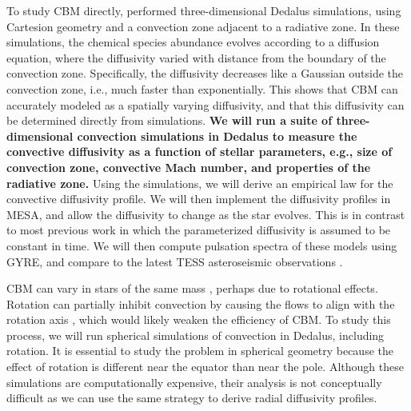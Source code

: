 To study CBM directly, \citet{Lecoanet_2016a} performed three-dimensional Dedalus simulations, using Cartesion geometry and a convection zone adjacent to a radiative zone. In these simulations, the chemical species abundance evolves according to a diffusion equation, where the diffusivity varied with distance from the boundary of the convection zone. Specifically, the diffusivity decreases like a Gaussian outside the convection zone, i.e., much faster than exponentially. This shows that CBM can accurately modeled as a spatially varying diffusivity, and that this diffusivity can be determined directly from simulations. \textbf{We will run a suite of three-dimensional convection simulations in Dedalus to measure the convective diffusivity as a function of stellar parameters, e.g., size of convection zone, convective Mach number, and properties of the radiative zone.} Using the simulations, we will derive an empirical law for the convective diffusivity profile. We will then implement the diffusivity profiles in MESA, and allow the diffusivity to change as the star evolves. {\color{green} This is in contrast to most previous work in which the parameterized diffusivity is assumed to be constant in time.} We will then compute pulsation spectra of these models using GYRE, and compare to the latest TESS asteroseismic observations \citep[similar to][]{moravveji:15,Ghasemi_2016}.

CBM can vary in stars of the same mass \citep{Stancliffe_2015}, perhaps due to rotational effects. Rotation can partially inhibit convection by causing the flows to align with the rotation axis \cite[e.g.,][]{Featherstone_2016}, which would likely weaken the efficiency of CBM. To study this process, we will run spherical simulations of convection in Dedalus, including rotation. It is essential to study the problem in spherical geometry because the effect of rotation is different near the equator than near the pole. Although these simulations are computationally expensive, their analysis is not conceptually difficult as we can use the same strategy to derive radial diffusivity profiles.
